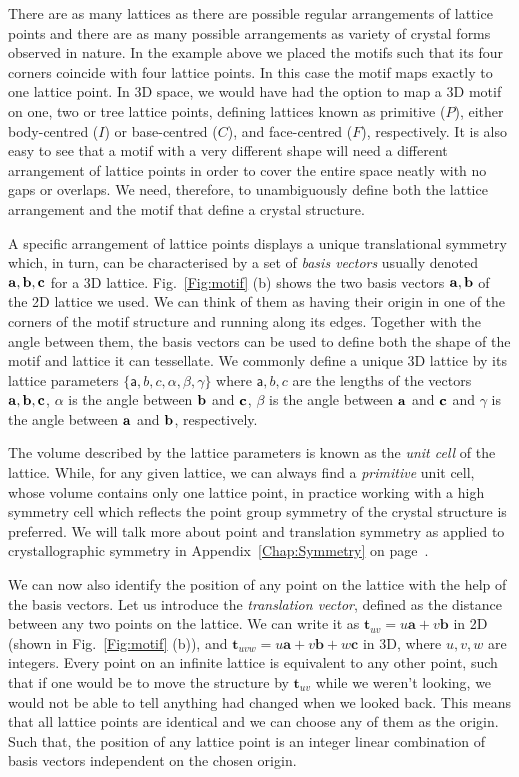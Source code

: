 \label{Sect:spaceLattice}
There are as many lattices as there are possible regular arrangements of lattice points and there are as many possible arrangements as variety of crystal forms observed in nature. In the example above we placed the motifs such that its four corners coincide with four lattice points. In this case the motif maps exactly to one lattice point. In 3D space, we would have had the option to map a 3D motif on one, two or tree lattice points, defining lattices known as primitive ($P$), either body-centred ($I$) or base-centred ($C$), and face-centred ($F$), respectively. It is also easy to see that a motif with a very different shape will need a different arrangement of lattice points in order to cover the entire space neatly with no gaps or overlaps. We need, therefore, to unambiguously define both the lattice arrangement and the motif that define a crystal structure.   

A specific arrangement of lattice points displays a unique translational symmetry which, in turn, can be characterised by a set of \textit{basis vectors} usually denoted $\vb{a}, \vb{b}, \vb{c}$ for a 3D lattice. Fig.~\ref{Fig:motif} (b) shows the two basis vectors $\vb{a}, \vb{b}$ of the 2D lattice we used. We can think of them as having their origin in one of the corners of the motif structure and running along its edges. Together with the angle between them, the basis vectors can be used to define both the shape of the motif and lattice it can tessellate. We commonly define a unique 3D lattice by its lattice parameters $\{\mathsf{a}, b, c, \alpha, \beta, \gamma\}$ where $\mathsf{a}, b, c$ are the lengths of the vectors $\vb{a}, \vb{b}, \vb{c}$, $\alpha$ is the angle between $\vb{b}$ and $\vb{c}$, $\beta$ is the angle between $\vb{a}$ and $\vb{c}$ and $\gamma$ is the angle between $\vb{a}$ and $\vb{b}$, respectively. 

The volume described by the lattice parameters is known as the \textit{unit cell} of the lattice. While, for any given lattice, we can always find a \textit{primitive} unit cell, whose volume contains only one lattice point, in practice working with a high symmetry cell which reflects the point group symmetry of the crystal structure is preferred. We will talk more about point and translation symmetry as applied to crystallographic symmetry in Appendix~\ref{Chap:Symmetry} on page~\pageref{Chap:Symmetry}.

We can now also identify the position of any point on the lattice with the help of the basis vectors. Let us introduce the \textit{translation vector}, defined as the distance between any two points on the lattice. We can write it as $\mathbf{t}_{uv}=u\mathbf{a}+v\mathbf{b}$ in 2D (shown in Fig.~\ref{Fig:motif} (b)), and $\mathbf{t}_{uvw}=u\mathbf{a}+v\mathbf{b}+w\mathbf{c}$ in 3D, where $u, v, w$ are integers. Every point on an infinite lattice is equivalent to any other point, such that if one would be to move the structure by $\mathbf{t}_{uv}$ while we weren't looking, we would not be able to tell anything had changed when we looked back. This means that all lattice points are identical and we can choose any of them as the origin. Such that, the position of any lattice point is an integer linear combination of basis vectors independent on the chosen origin.

